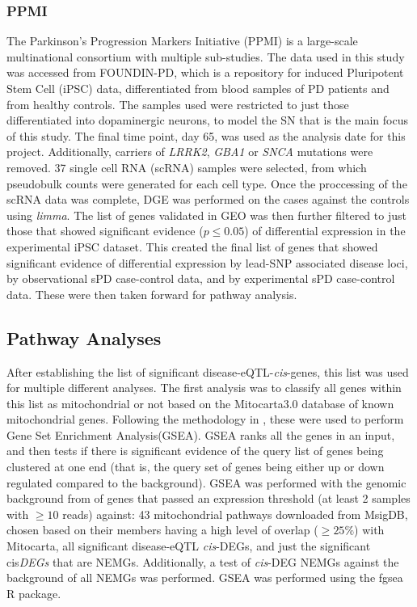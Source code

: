 \documentclass{article}
\begin{document}
\subsubsection{PPMI}
The Parkinson's Progression Markers Initiative (PPMI)\cite{Marek2011ThePPMI} is a large-scale multinational consortium with multiple sub-studies. The data used in this study was accessed from FOUNDIN-PD\cite{Bressan2023TheMechanism}, which is a repository for induced Pluripotent Stem Cell (iPSC) data, differentiated from blood samples of PD patients and from healthy controls. The samples used were restricted to just those differentiated into dopaminergic neurons, to model the SN that is the main focus of this study. The final time point, day 65, was used as the analysis date for this project. Additionally, carriers of \textit{LRRK2}, \textit{GBA1} or \textit{SNCA} mutations were removed. 37 single cell RNA (scRNA) samples were selected, from which pseudobulk counts were generated for each cell type. Once the proccessing of the scRNA data was complete, DGE was performed on the cases against the controls using \textit{limma}\cite{Ritchie2015LimmaStudies}. The list of genes validated in GEO was then further filtered to just those that showed significant evidence ($p\leq0.05$) of differential expression in the experimental iPSC dataset. This created the final list of genes that showed significant evidence of differential expression by lead-SNP associated disease loci, by observational sPD case-control data, and by experimental sPD case-control data. These were then taken forward for pathway analysis.
\subsection{Pathway Analyses}
After establishing the list of significant disease-eQTL-\textit{cis}-genes, this list was used for multiple different analyses. The first analysis was to classify all genes within this list as mitochondrial or not based on the Mitocarta3.0 database\cite{Rath2021MitoCarta3.0:Annotations} of known mitochondrial genes. Following the methodology in \cite{Maude2021NewDiabetes.}, these were used to perform Gene Set Enrichment Analysis\cite{Subramanian2005GeneProfiles}(GSEA). GSEA ranks all the genes in an input, and then tests if there is significant evidence of the query list of genes being clustered at one end (that is, the query set of genes being either up or down regulated compared to the background). GSEA was performed with the genomic background from of genes that passed an expression threshold (at least 2 samples with $\geq 10$ reads) against: 43 mitochondrial pathways downloaded from MsigDB\cite{Liberzon2011Molecular3.0}, chosen based on their members having a high level of overlap ($\geq25\%$) with Mitocarta\cite{Rath2021MitoCarta3.0:Annotations}, all significant disease-eQTL \textit{cis}-DEGs, and just the significant cis\textit{DEGs} that are NEMGs. Additionally, a test of \textit{cis}-DEG NEMGs against the background of all NEMGs was performed. GSEA was performed using the fgsea R package\cite{KorotkevichG2019FastAnalysis}.
\end{document}
